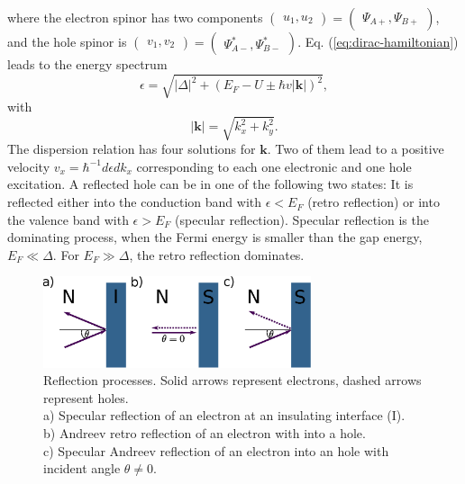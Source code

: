 where the electron spinor has two components $\begin{pmatrix} u_1, u_2\end{pmatrix} = \begin{pmatrix} \Psi_{A+}, \Psi_{B+} \end{pmatrix}$, and the hole spinor is $\begin{pmatrix} v_1, v_2\end{pmatrix} = \begin{pmatrix} \Psi^{*}_{A-},  \Psi^{*}_{B-} \end{pmatrix}$.
Eq. (\ref{eq:dirac-hamiltonian}) leads to the energy spectrum
\begin{equation}
\epsilon = \sqrt{|\Delta|^2 + \left( E_F - U \pm \hbar v |\mathbf{k}|\right) ^2},  
\end{equation}
with
\begin{equation}
|\mathbf{k}| = \sqrt{k_x^2 + k_y^2}.
\end{equation}
The dispersion relation has four solutions for $\mathbf{k}$. Two of them lead to a positive velocity $v_x = \hbar^{-1} d \epsilon d k_x$ corresponding to each one electronic and one hole excitation. A reflected hole can be in one of the following two states: It is reflected either into the conduction band with $\epsilon < E_F$ (retro reflection) or into the valence band with $\epsilon > E_F$ (specular reflection). Specular reflection is the dominating process, when the Fermi energy is smaller than the gap energy, $E_F \ll \Delta$. For $E_F \gg \Delta$, the retro reflection dominates. 
\begin{figure}
\centering
\includegraphics[width=0.7\textwidth]{figure/framework-analytical/specular-reflection}
\caption{Reflection processes. Solid arrows represent electrons, dashed arrows represent holes. \\ a) Specular reflection of an electron at an insulating interface (I). \\ b) Andreev retro reflection of an electron with into a hole. \\ c) Specular Andreev reflection of an electron into an hole with incident angle $\theta \neq 0$.}\label{fig:specular-sns}
\end{figure}

 
